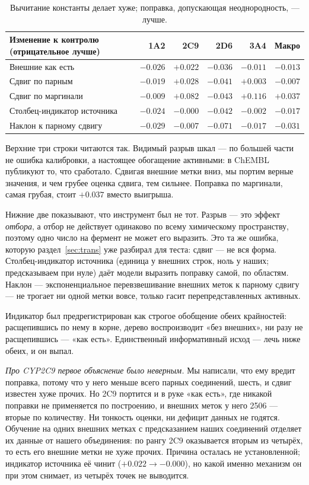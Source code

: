 \begin{table}[htbp]\centering\small
\begin{tabularx}{\textwidth}{@{}Xrrrrr@{}}
\toprule
Изменение к контролю (отрицательное лучше) & 1A2 & 2C9 & 2D6 & 3A4 & Макро \\
\midrule
Внешние как есть        & $-0.026$ & $+0.022$ & $-0.036$ & $-0.011$ & $-0.013$ \\
Сдвиг по парным         & $-0.019$ & $+0.028$ & $-0.041$ & $+0.003$ & $-0.007$ \\
Сдвиг по маргинали      & $-0.009$ & $+0.082$ & $-0.043$ & $+0.116$ & $+0.037$ \\
\midrule
Столбец-индикатор источника & $-0.024$ & $\mathbf{-0.000}$ & $-0.042$ & $-0.002$ & $-0.017$ \\
Наклон к парному сдвигу     & $-0.029$ & $-0.007$ & $\mathbf{-0.071}$ & $-0.017$ & $\mathbf{-0.031}$ \\
\bottomrule
\end{tabularx}
\caption{Вычитание константы делает хуже; поправка, допускающая неоднородность, --- лучше.}
\label{tab:ext}
\end{table}

Верхние три строки читаются так. Видимый разрыв шкал --- по большей части не ошибка
калибровки, а настоящее обогащение активными: в ChEMBL публикуют то, что сработало. Сдвигая
внешние метки вниз, мы портим верные значения, и чем грубее оценка сдвига, тем сильнее.
Поправка по маргинали, самая грубая, стоит $+0.037$ вместо выигрыша.

Нижние две показывают, что инструмент был не тот. Разрыв --- это эффект \emph{отбора}, а
отбор не действует одинаково по всему химическому пространству, поэтому одно число на фермент
не может его выразить. Это та же ошибка, которую раздел~\ref{sec:trans} уже разбирал для
теста: сдвиг --- не вся форма. Столбец-индикатор источника (единица у внешних строк, ноль у
наших; предсказываем при нуле) даёт модели выразить поправку самой, по областям. Наклон ---
экспоненциальное перевзвешивание внешних меток к парному сдвигу --- не трогает ни одной метки
вовсе, только гасит перепредставленных активных.

Индикатор был предрегистрирован как строгое обобщение обеих крайностей: расщепившись по нему
в корне, дерево воспроизводит «без внешних», ни разу не расщепившись --- «как есть».
Единственный информативный исход --- лечь ниже обеих, и он выпал.

\emph{Про CYP2C9 первое объяснение было неверным.} Мы написали, что ему вредит поправка,
потому что у него меньше всего парных соединений, шесть, и сдвиг известен хуже прочих. Но
2C9 портится и в руке «как есть», где никакой поправки не применяется по построению, и
внешних меток у него 2506 --- вторые по количеству. Ни тонкость оценки, ни дефицит данных не
годятся. Обучение на одних внешних метках с предсказанием наших соединений отделяет их данные
от нашего объединения: по рангу 2C9 оказывается вторым из четырёх, то есть его внешние метки
не хуже прочих. Причина осталась не установленной; индикатор источника её чинит
($+0.022 \to -0.000$), но какой именно механизм он при этом снимает, из четырёх точек не
выводится.

